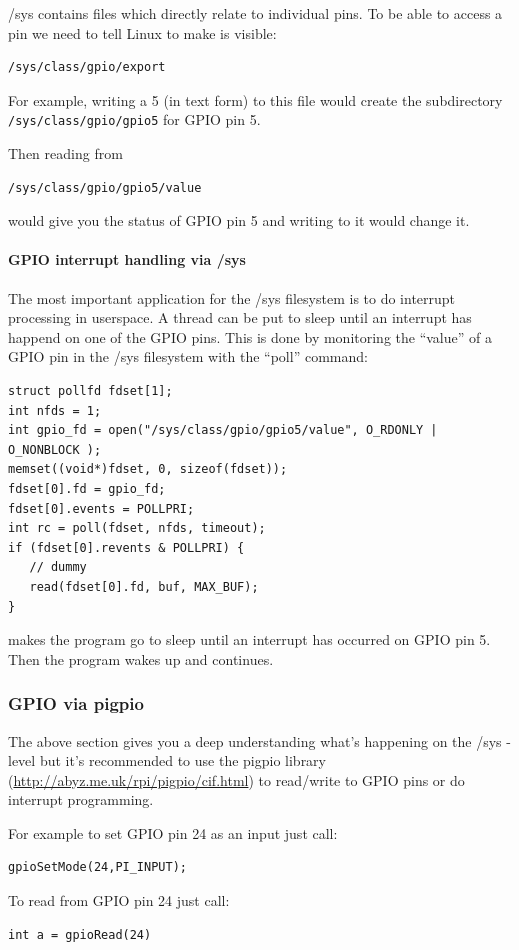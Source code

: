 \documentclass[12pt]{report}
\begin{document}
/sys contains files which directly relate to individual pins.
To be able to access a pin we need to tell Linux to make
is visible:
\begin{verbatim}
/sys/class/gpio/export
\end{verbatim}
For example, writing a 5 (in text form) to this file would
create the subdirectory \texttt{/sys/class/gpio/gpio5} for GPIO pin 5.

Then reading from
\begin{verbatim}
/sys/class/gpio/gpio5/value
\end{verbatim}
would give you the status of GPIO pin 5 and writing
to it would change it.

\paragraph{GPIO interrupt handling via /sys}
The most important application for the /sys filesystem is to
do interrupt processing in userspace.
A thread can be put to sleep until an interrupt has happend on one of
the GPIO pins. This is done by monitoring the ``value''
of a GPIO pin in the /sys filesystem with the ``poll'' command:
\begin{verbatim}
struct pollfd fdset[1];
int nfds = 1;
int gpio_fd = open("/sys/class/gpio/gpio5/value", O_RDONLY | O_NONBLOCK );
memset((void*)fdset, 0, sizeof(fdset));
fdset[0].fd = gpio_fd;
fdset[0].events = POLLPRI;
int rc = poll(fdset, nfds, timeout);
if (fdset[0].revents & POLLPRI) {
   // dummy
   read(fdset[0].fd, buf, MAX_BUF);
}
\end{verbatim}
makes the program go to sleep until an interrupt has occurred on
GPIO pin 5. Then the program wakes up and continues.

\subsubsection{GPIO via pigpio}
The above section gives you a deep understanding what's happening
on the /sys - level but it's recommended to
use the pigpio library (\url{http://abyz.me.uk/rpi/pigpio/cif.html})
to read/write to GPIO pins or do interrupt programming.

For example to set GPIO pin 24 as an input just call:
\begin{verbatim}
gpioSetMode(24,PI_INPUT);
\end{verbatim}

To read from GPIO pin 24 just call:
\begin{verbatim}
int a = gpioRead(24)
\end{verbatim}
\end{document}
